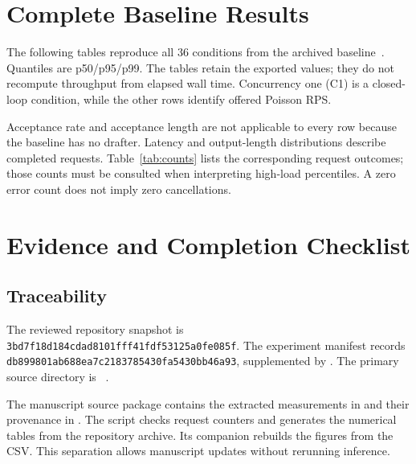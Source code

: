 \appendix
\chapter{Complete Baseline Results}
\label{app:baseline}

The following tables reproduce all 36 conditions from the archived baseline~\cite{baseline}. Quantiles are p50/p95/p99. The tables retain the exported values; they do not recompute throughput from elapsed wall time. Concurrency one (C1) is a closed-loop condition, while the other rows identify offered Poisson RPS.

Acceptance rate and acceptance length are not applicable to every row because the baseline has no drafter. Latency and output-length distributions describe completed requests. Table~\ref{tab:counts} lists the corresponding request outcomes; those counts must be consulted when interpreting high-load percentiles. A zero error count does not imply zero cancellations.


\clearpage
\begin{landscape}

\clearpage

\clearpage

\end{landscape}

\chapter{Evidence and Completion Checklist}
\label{app:checklist}

\section{Traceability}
The reviewed repository snapshot is \nolinkurl{3bd7f18d184cdad8101fff41fdf53125a0fe085f}. The experiment manifest records \nolinkurl{db899801ab688ea7c2183785430fa5430bb46a93}, supplemented by . The primary source directory is ~\cite{baseline}.

The manuscript source package contains the extracted measurements in  and their provenance in . The script  checks request counters and generates the numerical tables from the repository archive. Its companion  rebuilds the figures from the CSV. This separation allows manuscript updates without rerunning inference.

